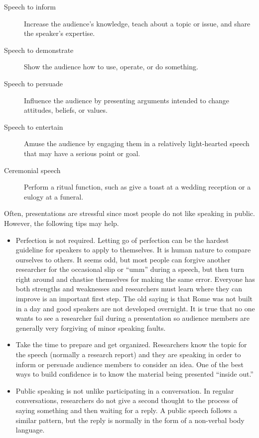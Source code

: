 \begin{description}
	\item[Speech to inform] Increase the audience's knowledge, teach about a topic or issue, and share the speaker's expertise.
	\item[Speech to demonstrate] Show the audience how to use, operate, or do something.
	\item[Speech to persuade] Influence the audience by presenting arguments intended to change attitudes, beliefs, or values.
	\item[Speech to entertain] Amuse the audience by engaging them in a
	relatively light-hearted speech that may have a serious point or goal.
	\item[Ceremonial speech] Perform a ritual function, such as give a toast at a wedding reception or a eulogy at a funeral.
\end{description}

Often, presentations are stressful since most people do not like speaking in public. However, the following tips may help.

\begin{itemize}
	\item Perfection is not required. Letting go of perfection can be the hardest guideline for speakers to apply to themselves. It is human nature to compare ourselves to others. It seems odd, but most people can forgive another researcher for the occasional slip or ``umm'' during a speech, but then turn right around and chastise themselves for making the same error. Everyone has both strengths and weaknesses and researchers must learn where they can improve is an important first step. The old saying is that Rome was not built in a day and good speakers are not developed overnight. It is true that no one wants to see a researcher fail during a presentation so audience members are generally very forgiving of minor speaking faults.
	
	\item Take the time to prepare and get organized. Researchers know the topic for the speech (normally a research report) and they are speaking in order to inform or persuade audience members to consider an idea. One of the best ways to build confidence is to know the material being presented ``inside out.''
	
	\item Public speaking is not unlike participating in a conversation. In regular conversations, researchers do not give a second thought to the process of saying something and then waiting for a reply. A public speech follows a similar pattern, but the reply is normally in the form of a non-verbal body language.

\end{itemize}

